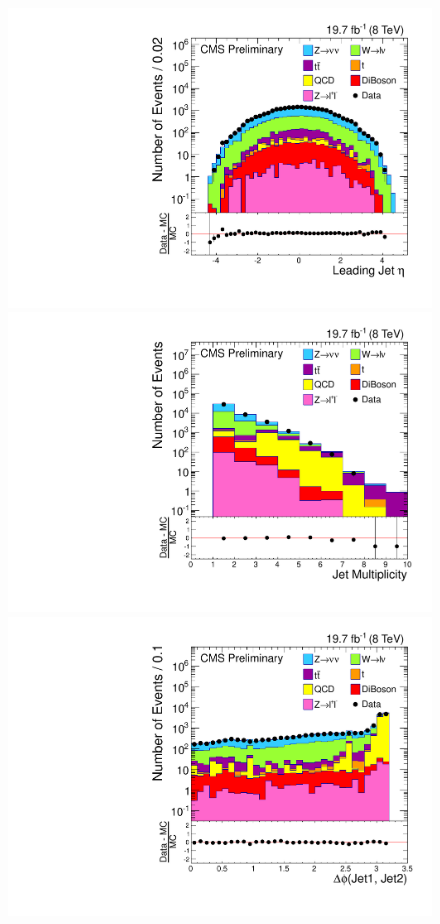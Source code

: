 \begin{figure}
\begin{center}
  \includegraphics[scale=0.32]     {Figures/sus13009/nocut/Jet2Eta.pdf}
  \includegraphics[scale=0.32]     {Figures/sus13009/nocut/NJet.pdf}
  \includegraphics[scale=0.32]     {Figures/sus13009/nocut/dPhi_Jet1_Jet2.pdf}

\end{center}
\end{figure}
